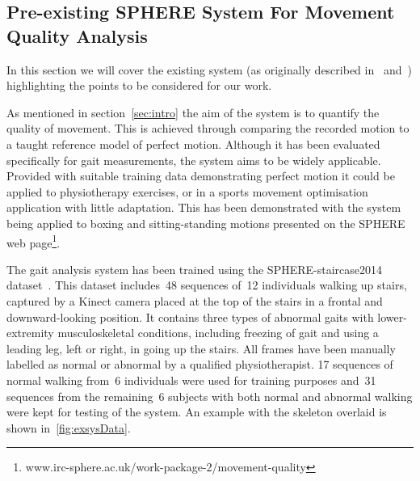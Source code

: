 \documentclass[11pt]{article} %
\begin{document}
\begin{appendices}

\section{Pre-existing SPHERE System For Movement Quality Analysis}

\label{sec:exSys}

In this section we will cover the existing system (as originally described in~\cite{Paiement} and~\cite{Tao}) highlighting the points to be considered for our work.

As mentioned in section~\ref{sec:intro} the aim of the system is to quantify the quality of movement. This is achieved through comparing the recorded motion to a taught reference model of perfect motion. Although it has been evaluated specifically for gait measurements, the system aims to be widely applicable. Provided with suitable training data demonstrating perfect motion it could be applied to physiotherapy exercises, or in a sports movement optimisation application with little adaptation. This has been demonstrated with the system being applied to boxing and sitting-standing motions presented on the SPHERE web page\footnote{www.irc-sphere.ac.uk/work-package-2/movement-quality}.


The gait analysis system has been trained using the SPHERE-staircase2014 dataset~\cite{Paiement}. This dataset includes~48 sequences of~12 individuals walking up stairs, captured by a Kinect camera placed at the top of the stairs in a frontal and downward-looking position. It contains three types of abnormal gaits with lower-extremity musculoskeletal conditions, including freezing of gait and using a leading leg, left or right, in going up the stairs. All frames have been manually labelled as normal or abnormal by a qualified physiotherapist. 17 sequences of normal walking from~6 individuals were used for training purposes and~31 sequences from the remaining~6 subjects with both normal and abnormal walking were kept for testing of the system. An example with the skeleton overlaid is shown in~\ref{fig:exsysData}.



\end{appendices}
\end{document}
